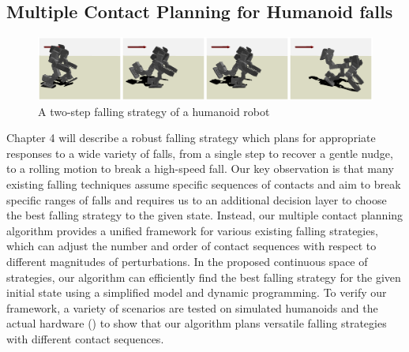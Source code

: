 \subsection{Multiple Contact Planning for Humanoid falls}
\begin{figure}[h]
  \begin{center}
    \includegraphics[width=1.0\textwidth]{images/intro_gp_tripod}
  \end{center}
  \caption{A two-step falling strategy of a humanoid robot}
  \label{fig:intro_hardware}
\end{figure}
Chapter 4 will describe a robust falling strategy which plans for appropriate 
responses to a wide variety of falls, from a single step to recover a gentle
nudge, to a rolling motion to break a high-speed fall.
Our key observation is that many existing falling techniques
\cite{Wang:2012:WTO,Yun:2014:TFC,ZenpoUkemi:2014:URL}
assume specific sequences of contacts and aim to break specific ranges of
falls and requires us to an additional decision layer to choose the best
falling strategy to the given state.
Instead, our multiple contact planning algorithm provides a unified framework
for various existing falling strategies, which can adjust the number and order
of contact sequences with respect to different magnitudes of perturbations.
In the proposed continuous space of strategies, our algorithm can efficiently
find the best falling strategy for the given initial state using a simplified
model and dynamic  programming.
To verify our framework, a variety of scenarios are tested on simulated
humanoids and the actual hardware () to show that our
algorithm plans versatile falling strategies with different contact sequences.

